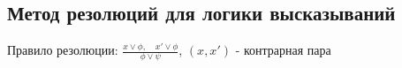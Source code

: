 \documentclass[a4paper]{article}
\theoremstyle{definition}
\theoremstyle{remark}
\begin{document}








    \subsection{Метод резолюций для логики высказываний}
    Правило резолюции: $\frac{x \vee \phi, \quad x' \vee \phi}{\phi \vee \psi}$, $(x, x')$ - контрарная пара
\end{document}
